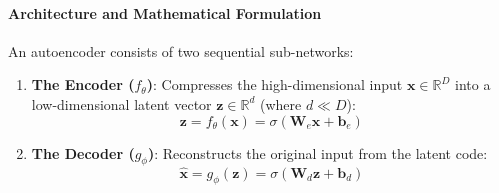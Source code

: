 \paragraph{Architecture and Mathematical Formulation}
An autoencoder consists of two sequential sub-networks:
\begin{enumerate}
    \item \textbf{The Encoder ($f_\theta$)}: Compresses the high-dimensional input $\mathbf{x} \in \mathbb{R}^D$ into a low-dimensional latent vector $\mathbf{z} \in \mathbb{R}^d$ (where $d \ll D$):
    \begin{equation}
    \mathbf{z} = f_\theta(\mathbf{x}) = \sigma(\mathbf{W}_e \mathbf{x} + \mathbf{b}_e)\label{eq:encoder}
    \end{equation}
    \item \textbf{The Decoder ($g_\phi$)}: Reconstructs the original input from the latent code:
    \begin{equation}
    \hat{\mathbf{x}} = g_\phi(\mathbf{z}) = \sigma(\mathbf{W}_d \mathbf{z} + \mathbf{b}_d)\label{eq:decoder}
    \end{equation}
\end{enumerate}

